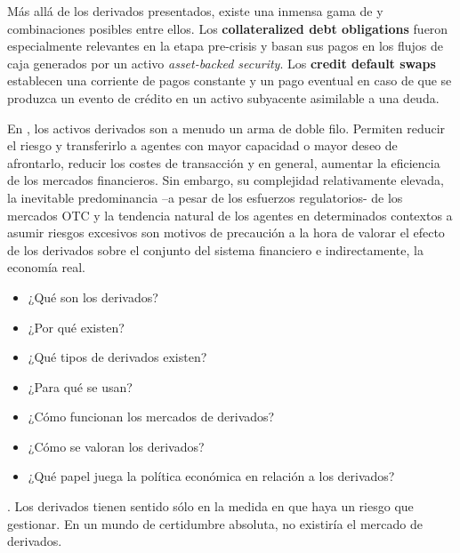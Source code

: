 \documentclass{nuevotema}
\begin{document}
Más allá de los derivados presentados, existe una inmensa gama de  y combinaciones posibles entre ellos. Los \textbf{collateralized debt obligations} fueron especialmente relevantes en la etapa pre-crisis y basan sus pagos en los flujos de caja generados por un activo \textit{asset-backed security}. Los \textbf{credit default swaps} establecen una corriente de pagos constante y un pago eventual en caso de que se produzca un evento de crédito en un activo subyacente asimilable a una deuda.

En , los activos derivados son a menudo un arma de doble filo. Permiten reducir el riesgo y transferirlo a agentes con mayor capacidad o mayor deseo de afrontarlo, reducir los costes de transacción y en general, aumentar la eficiencia de los mercados financieros. Sin embargo, su complejidad relativamente elevada, la inevitable predominancia --a pesar de los esfuerzos regulatorios- de los mercados OTC y la tendencia natural de los agentes en determinados contextos a asumir riesgos excesivos son motivos de precaución a la hora de valorar el efecto de los derivados sobre el conjunto del sistema financiero e indirectamente, la economía real.

\begin{itemize}
    \item ¿Qué son los derivados? 
    \item ¿Por qué existen? 
    \item ¿Qué tipos de derivados existen? 
    \item ¿Para qué se usan? 
    \item ¿Cómo funcionan los mercados de derivados? 
    \item ¿Cómo se valoran los derivados? 
    \item ¿Qué papel juega la política económica en relación a los derivados?
\end{itemize}

. Los derivados tienen sentido sólo en la medida en que haya un riesgo que gestionar. En un mundo de certidumbre absoluta, no existiría el mercado de derivados.

\esquemacorto
\end{document}
